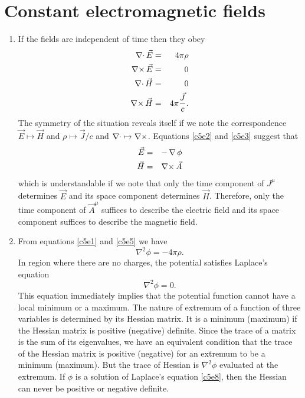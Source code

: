 \chapter{Constant electromagnetic fields}\label{c5}
\begin{enumerate}
\item If the fields are independent of time then they obey
\begin{eqnarray}
\operatorname{\nabla\cdot}\vec{E} &=& 4\pi\rho \label{c5e1} \\
\operatorname{\nabla\times}\vec{E} &=& 0 \label{c5e2} \\
\operatorname{\nabla\cdot}\vec{H} &=& 0 \label{c5e3} \\
\operatorname{\nabla\times}\vec{H} &=& 4\pi\frac{\vec{J}}{c}. \label{c5e4}
\end{eqnarray}
The symmetry of the situation reveals itself if we note the correspondence 
$\vec{E} \mapsto \vec{H}$ and $\rho \mapsto \vec{J}/c$ and $\operatorname{\nabla\cdot} \mapsto 
\operatorname{\nabla\times}$. Equations \eqref{c5e2} and \eqref{c5e3} suggest that
\begin{eqnarray}
\vec{E} &=& -\operatorname{\nabla}\phi \label{c5e5} \\
\vec{H} &=& \operatorname{\nabla\times}\vec{A} \label{c5e6}
\end{eqnarray}
which is understandable if we note that only the time component of $J^\mu$ 
determines $\vec{E}$ and its space component determines $\vec{H}$. Therefore,
only the time component of $\vec{A}^\mu$ suffices to describe the electric
field and its space component suffices to describe the magnetic field.

\item From equations \eqref{c5e1} and \eqref{c5e5} we have
\begin{equation}\label{c5e7}
\nabla^2\phi = -4\pi\rho.
\end{equation}
In region where there are no charges, the potential satisfies Laplace's equation
\begin{equation}\label{c5e8}
\nabla^2\phi = 0.
\end{equation}
This equation immediately implies that the potential function cannot have a 
local minimum or a maximum. The nature of extremum of a function of three 
variables is determined by its Hessian matrix. It is a minimum (maximum) if 
the Hessian matrix is positive (negative) definite. Since the trace of a matrix 
is the sum of its eigenvalues, we have an equivalent condition that the trace 
of the Hessian matrix is positive (negative) for an extremum to be a minimum 
(maximum). But the trace of Hessian is $\nabla^2\phi$ evaluated at the 
extremum. If $\phi$ is a solution of Laplace's equation \eqref{c5e8}, then the 
Hessian can never be positive or negative definite.


\end{enumerate}

